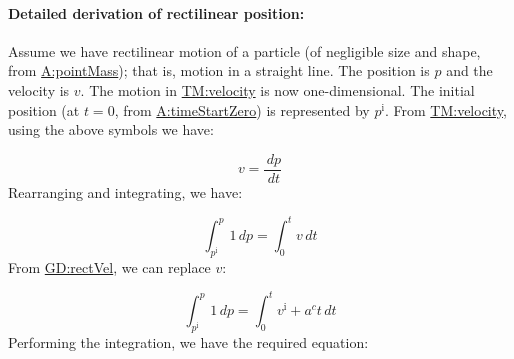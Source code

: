 \documentclass[12pt]{article}
\begin{document}
\paragraph{Detailed derivation of rectilinear position:}
\label{GD:rectPosDeriv}
Assume we have rectilinear motion of a particle (of negligible size and shape, from \hyperref[pointMass]{A:pointMass}); that is, motion in a straight line. The position is $p$ and the velocity is $v$. The motion in \hyperref[TM:velocity]{TM:velocity} is now one-dimensional. The initial position (at $t=0$, from \hyperref[timeStartZero]{A:timeStartZero}) is represented by ${p^{\text{i}}}$. From \hyperref[TM:velocity]{TM:velocity}, using the above symbols we have:

\begin{displaymath}
v=\frac{\,dp}{\,dt}
\end{displaymath}
Rearranging and integrating, we have:

\begin{displaymath}
\int_{{p^{\text{i}}}}^{p}{1}\,dp=\int_{0}^{t}{v}\,dt
\end{displaymath}
From \hyperref[GD:rectVel]{GD:rectVel}, we can replace $v$:

\begin{displaymath}
\int_{{p^{\text{i}}}}^{p}{1}\,dp=\int_{0}^{t}{{v^{\text{i}}}+{a^{c}} t}\,dt
\end{displaymath}
Performing the integration, we have the required equation:
\end{document}

